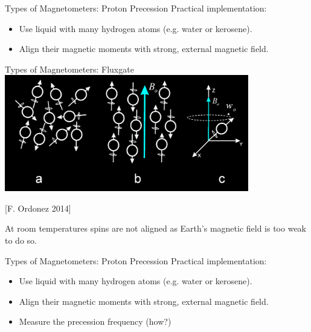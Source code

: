 \begin{frame}
  \begin{PointSix}{Types of Magnetometers: Proton Precession}
    \small
    \alert{Practical implementation:}
    \begin{itemize}
      \item Use liquid with many hydrogen atoms (e.g. water or kerosene).
      \item Align their magnetic moments with strong, external magnetic field.
    \end{itemize}
  \end{PointSix}
\end{frame}


\begin{frame}{Types of Magnetometers: Fluxgate}
    \includegraphics[width=0.8\textwidth]{Figures/Magnetics/ProtonPrecessionSpinAlignment_FOrdonez2014.png}
    
    \tiny [F. Ordonez 2014]

    \alert{\small At room temperatures spins are not aligned as Earth's magnetic field is too weak to do so.}
\end{frame}

\begin{frame}
  \begin{PointSix}{Types of Magnetometers: Proton Precession}
    \small
    \alert{Practical implementation:}
    \begin{itemize}
      \item Use liquid with many hydrogen atoms (e.g. water or kerosene).
      \item Align their magnetic moments with strong, external magnetic field.
      \item Measure the precession frequency (how?)
    \end{itemize}
  \end{PointSix}
\end{frame}

